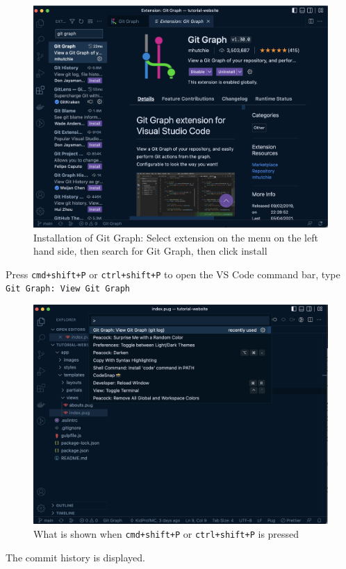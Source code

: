 \begin{figure}[H]
\centering
\includegraphics[width=12cm]{images/ch3-gitgraph0.png}
\caption{Installation of Git Graph: Select extension on the menu on the left hand side, then search for Git Graph, then click install}
\end{figure}

Press \texttt{cmd+shift+P} or \texttt{ctrl+shift+P} to open the VS Code command bar, type \texttt{Git Graph: View Git Graph}

\begin{figure}[H]
\centering
\includegraphics[width=12cm]{images/ch3-gitgraph1.png}
\caption{What is shown when \texttt{cmd+shift+P} or \texttt{ctrl+shift+P} is pressed}
\end{figure}

The commit history is displayed.

